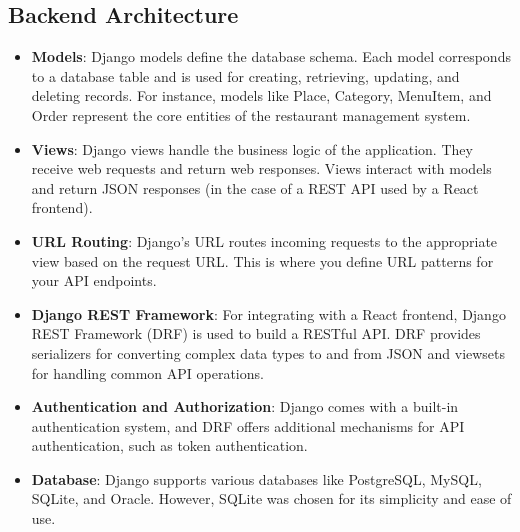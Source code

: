 \subsection{Backend Architecture}
\begin{itemize}
    \item \textbf{Models}: Django models define the database schema. Each model corresponds to a database table and is used for creating, retrieving, updating, and deleting records. For instance, models like Place, Category, MenuItem, and Order represent the core entities of the restaurant management system.
    \item \textbf{Views}: Django views handle the business logic of the application. They receive web requests and return web responses. Views interact with models and return JSON responses (in the case of a REST API used by a React frontend).
    \item \textbf{URL Routing}: Django's URL routes incoming requests to the appropriate view based on the request URL. This is where you define URL patterns for your API endpoints.
    \item \textbf{Django REST Framework}: For integrating with a React frontend, Django REST Framework (DRF) is used to build a RESTful API. DRF provides serializers for converting complex data types to and from JSON and viewsets for handling common API operations.
    \item \textbf{Authentication and Authorization}: Django comes with a built-in authentication system, and DRF offers additional mechanisms for API authentication, such as token authentication.
    \item \textbf{Database}: Django supports various databases like PostgreSQL, MySQL, SQLite, and Oracle. However, SQLite was chosen for its simplicity and ease of use.
\end{itemize}

